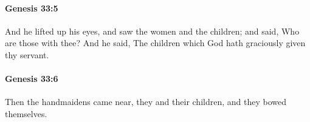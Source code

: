 		\paragraph{Genesis 33:5} %
			\label{GENESIS-33-5}

			And he lifted up his eyes, and saw the women and the children; and said, Who are those with thee? And he said, The children which God hath graciously given thy servant.


		\paragraph{Genesis 33:6} %
			\label{GENESIS-33-6}

			Then the handmaidens came near, they and their children, and they bowed themselves.


